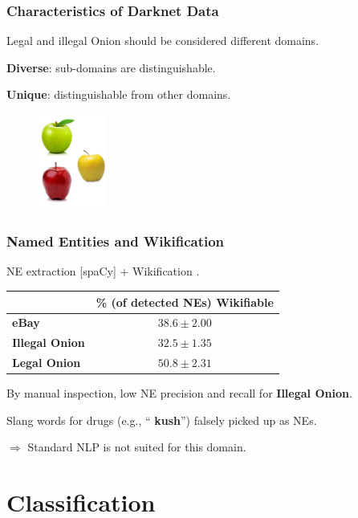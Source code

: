 \documentclass[t,xcolor={svgnames,table},aspectratio=169]{beamer}
\begin{document}
\begin{frame}
	\frametitle{Characteristics of Darknet Data}
	\LARGE
	
	Legal and illegal Onion should be considered different domains.
	
	\textbf{Diverse}: sub-domains are distinguishable.
	\vfill
	
	\textbf{Unique}: distinguishable from other domains.
	
	\begin{figure}
		\centering
		\includegraphics[width=0.2\textwidth]{3different.png}
	\end{figure}
\end{frame}

\begin{frame}
	\frametitle{Named Entities and Wikification}
	\Large
	
	NE extraction [spaCy] + Wikification \cite{bunescu2006using}.
	\vfill
	
	\begin{center}\LARGE
	\begin{tabular}{l|c}
	 & \% (of detected NEs) Wikifiable\\
	 \hline
	\textbf{\color{yellow} eBay} & $38.6 \pm2.00$\\
	\textbf{\color{red} Illegal Onion} & $32.5 \pm1.35$\\
	\textbf{\color{green} Legal Onion} & $50.8 \pm2.31$
	\end{tabular}
	\end{center}
	\vfill

	By manual inspection, low NE precision and recall for \textbf{\color{red} Illegal Onion}.
	
	Slang words for drugs (e.g., ``\textbf{\color{red} kush}'') falsely picked up as NEs.	
	\vfill
	
	$\Rightarrow$ Standard NLP is not suited for this domain.
\end{frame}

\section{Classification}
\end{document}
